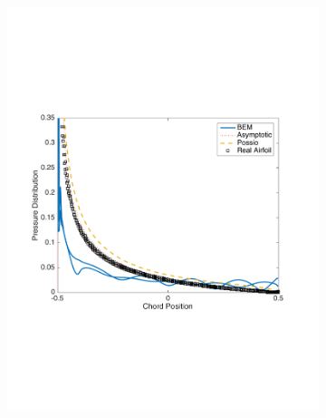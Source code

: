\documentclass{article}
\begin{document}
\begin{figure}[h]
\centering
\begin{subfigure}{0.3\textwidth}
	\centering
	\includegraphics[width = \textwidth, height=0.16\textheight]{NACA1101_pressure_k15mag}
\end{subfigure}%
\begin{subfigure}{0.3\textwidth}
	\centering

\end{subfigure}
\end{figure}
\end{document}
